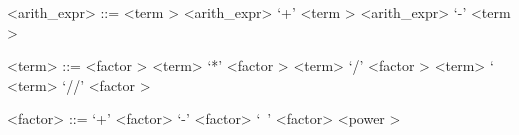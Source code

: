 \label{arithzzzexprb}

\begin{grammar}
<arith_expr> ::= <term \myref[termb]>
	\alt <arith_expr> `+' <term \myref[termb]>
	\alt <arith_expr> `-' <term \myref[termb]>
\end{grammar}


\label{termb}

\begin{grammar}
<term> ::= <factor \myref[factorb]>
	\alt <term> `*' <factor \myref[factorb]>
	\alt <term> `/' <factor \myref[factorb]>
	\alt <term> `%
	\alt <term> `//' <factor \myref[factorb]>
\end{grammar}


\label{factorb}

\begin{grammar}
<factor> ::= `+' <factor>
	\alt `-' <factor>
	\alt `~' <factor>
	\alt <power \myref[powerb]>
\end{grammar}

